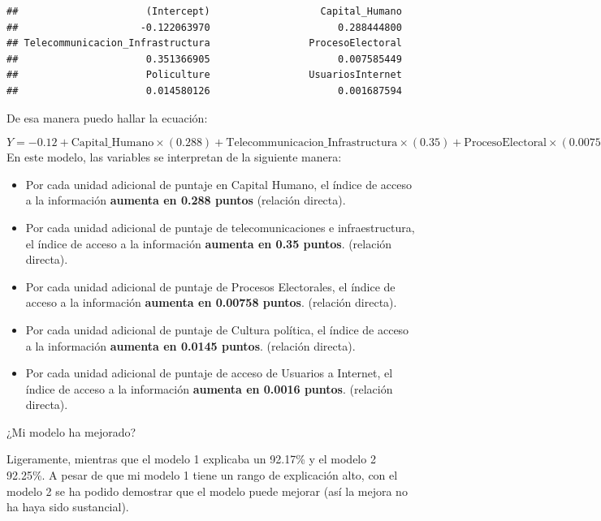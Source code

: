 \documentclass[
]{article}
\newenvironment{Shaded}{\begin{snugshade}}{\end{snugshade}}
\newcommand{\NormalTok}[1]{#1}
\newcommand{\SpecialCharTok}[1]{\textcolor[rgb]{0.81,0.36,0.00}{\textbf{#1}}}
\begin{document}
\begin{Shaded}
\end{Shaded}

\begin{verbatim}
##                      (Intercept)                   Capital_Humano 
##                     -0.122063970                      0.288444800 
## Telecommunicacion_Infrastructura                 ProcesoElectoral 
##                      0.351366905                      0.007585449 
##                      Policulture                 UsuariosInternet 
##                      0.014580126                      0.001687594
\end{verbatim}

De esa manera puedo hallar la ecuación:

\[
Y = -0.12 + \text{Capital\_Humano} \times (0.288) + \text{Telecommunicacion\_Infrastructura} \times (0.35) + \text{ProcesoElectoral} \times (0.00758) + \text{Policulture} \times (0.0145) + \text{UsuariosInternet} \times (0.0016)
\] En este modelo, las variables se interpretan de la siguiente manera:

\begin{itemize}
\item
  Por cada unidad adicional de puntaje en Capital Humano, el índice de
  acceso a la información \textbf{aumenta en 0.288 puntos} (relación
  directa).
\item
  Por cada unidad adicional de puntaje de telecomunicaciones e
  infraestructura, el índice de acceso a la información \textbf{aumenta
  en 0.35 puntos}. (relación directa).
\item
  Por cada unidad adicional de puntaje de Procesos Electorales, el
  índice de acceso a la información \textbf{aumenta en 0.00758 puntos}.
  (relación directa).
\item
  Por cada unidad adicional de puntaje de Cultura política, el índice de
  acceso a la información \textbf{aumenta en 0.0145 puntos}. (relación
  directa).
\item
  Por cada unidad adicional de puntaje de acceso de Usuarios a Internet,
  el índice de acceso a la información \textbf{aumenta en 0.0016
  puntos}. (relación directa).
\end{itemize}

¿Mi modelo ha mejorado?

Ligeramente, mientras que el modelo 1 explicaba un 92.17\% y el modelo 2
92.25\%. A pesar de que mi modelo 1 tiene un rango de explicación alto,
con el modelo 2 se ha podido demostrar que el modelo puede mejorar (así
la mejora no ha haya sido sustancial).
\end{document}
